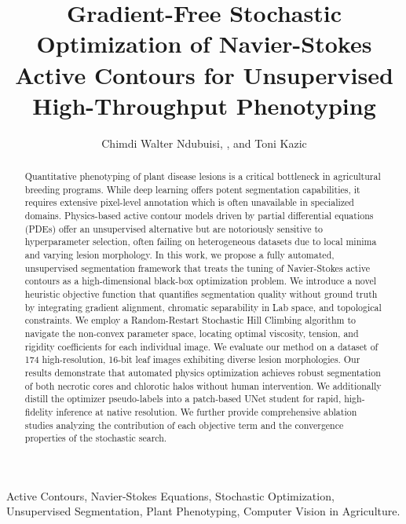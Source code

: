 \documentclass[journal]{IEEEtran}
\begin{document}
\title{Gradient-Free Stochastic Optimization of Navier-Stokes Active Contours for Unsupervised High-Throughput Phenotyping}

\author{Chimdi Walter Ndubuisi, , and Toni Kazic}

\maketitle

\begin{abstract}
Quantitative phenotyping of plant disease lesions is a critical bottleneck in agricultural breeding programs. While deep learning offers potent segmentation capabilities, it requires extensive pixel-level annotation which is often unavailable in specialized domains. Physics-based active contour models driven by partial differential equations (PDEs) offer an unsupervised alternative but are notoriously sensitive to hyperparameter selection, often failing on heterogeneous datasets due to local minima and varying lesion morphology. In this work, we propose a fully automated, unsupervised segmentation framework that treats the tuning of Navier-Stokes active contours as a high-dimensional black-box optimization problem. We introduce a novel heuristic objective function that quantifies segmentation quality without ground truth by integrating gradient alignment, chromatic separability in Lab space, and topological constraints. We employ a Random-Restart Stochastic Hill Climbing algorithm to navigate the non-convex parameter space, locating optimal viscosity, tension, and rigidity coefficients for each individual image. We evaluate our method on a dataset of 174 high-resolution, 16-bit leaf images exhibiting diverse lesion morphologies. Our results demonstrate that automated physics optimization achieves robust segmentation of both necrotic cores and chlorotic halos without human intervention. We additionally distill the optimizer pseudo-labels into a patch-based UNet student for rapid, high-fidelity inference at native resolution. We further provide comprehensive ablation studies analyzing the contribution of each objective term and the convergence properties of the stochastic search.
\end{abstract}

\begin{IEEEkeywords}
Active Contours, Navier-Stokes Equations, Stochastic Optimization, Unsupervised Segmentation, Plant Phenotyping, Computer Vision in Agriculture.
\end{IEEEkeywords}
\end{document}
